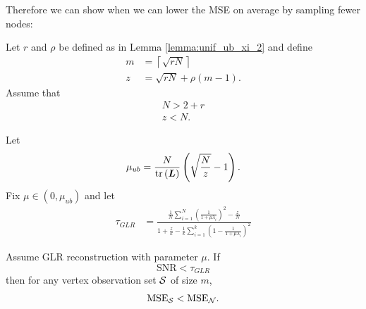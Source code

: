 {%

\iffalse
Therefore we can show when we can lower the MSE on average by sampling fewer nodes:

\begin{theorem}
\label{thm:main_GLR}
Let $r$ and $\rho$ be defined as in Lemma \ref{lemma:unif_ub_xi_2} and define
    \begin{align}
        m &= \left\lceil \sqrt{rN} \right\rceil \\
        z &= \sqrt{rN} + \rho(m-1).
    \end{align}
    Assume that
   \begin{align}
    N > 2+r \\
     z < N. \label{eq:GLR_b_constraint}
\end{align}
 
    Let 
    \begin{align}
        \mu_{ub} = \frac{N}{\textrm{tr}\left(\bm{L}\right)} \left( \sqrt{\frac{N}{z}}  -1 \right). \label{eq:mu_constraint_GLR}
        \end{align}
    Fix $\mu \in (0, \mu_{ub})$ and let 
        \begin{align}
        \tau_{GLR} &= \frac{\frac{1}{N}\sum_{i=1}^{N}\left(\frac{1}{1 + \mu \lambda_{i}}\right)^{2} - \frac{z}{N}}{1 + \frac{z}{k} - \frac{1}{k}\sum_{i=1}^{k}\left( 1 - \frac{1}{1 + \mu \lambda_{i}}\right)^{2} }
    \end{align}
    
    Assume GLR reconstruction with parameter $\mu$. If
    \begin{equation}
        \textrm{SNR} < \tau_{GLR}
        \label{eq:SNR_constraint_GLR}
    \end{equation}
    then for any vertex observation set $\mathcal{S}$ of size $m$,
    \begin{equation}
        \textrm{MSE}_{\mathcal{S}} < \textrm{MSE}_{\mathcal{N}}.
    \end{equation}
    

\end{theorem}}
